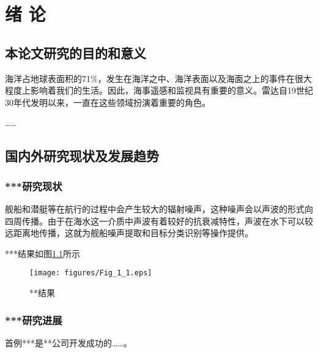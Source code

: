 \chapter{绪 论}
\label{chap:intro}
\section{本论文研究的目的和意义}


海洋占地球表面积的71\%，发生在海洋之中、海洋表面以及海面之上的事件在很大程度上影响着我们的生活。因此，海事遥感和监视具有重要的意义。雷达自19世纪30年代发明以来，一直在这些领域扮演着重要的角色。

……

\section{国内外研究现状及发展趋势}


\subsection{***研究现状}

舰船和潜艇等在航行的过程中会产生较大的辐射噪声，这种噪声会以声波的形式向四周传播。由于在海水这一介质中声波有着较好的抗衰减特性，声波在水下可以较远距离地传播，这就为舰船噪声提取和目标分类识别等操作提供\cite{Jiang2005Size}。

***结果如图\ref{fig:diagram}所示

\begin{figure}
 \centering
 \texttt{[image: figures/Fig\_1\_1.eps]}
 \caption{**结果}\label{fig:diagram}
\end{figure}


\subsection{***研究进展}

首例***是**公司开发成功的……。

